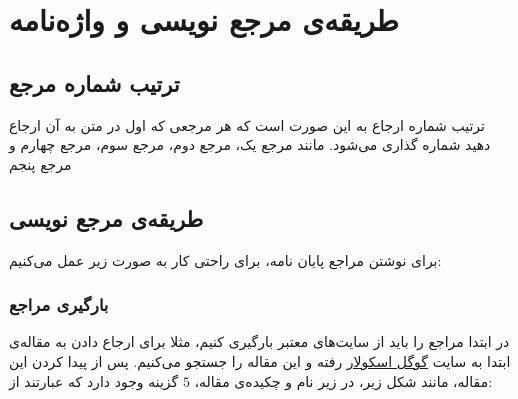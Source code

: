\chapter{طریقه‌ی مرجع نویسی و واژه‌نامه‌}
\section{ترتیب شماره مرجع}
ترتیب شماره ارجاع به این صورت است که هر مرجعی که اول در متن به آن ارجاع دهید شماره گذاری می‌شود. مانند مرجع یک\cite{ahmadi}،
مرجع دوم\cite{zakeri}، 
مرجع سوم\cite{bidabad2007classification}، 
مرجع چهارم\cite{aa}
و مرجع پنجم\cite{taghirad}
\section{طریقه‌ی مرجع نویسی}
برای نوشتن مراجع پایان نامه، برای راحتی کار به صورت زیر عمل می‌کنیم:

\subsection{بارگیری مراجع}
در ابتدا مراجع را باید از سایت‌های معتبر بارگیری کنیم، مثلا برای ارجاع دادن به مقاله‌ی
ابتدا به سایت
\href{scholar.google.com}{گوگل اسکولار} 
رفته و این مقاله را جستجو می‌کنیم. پس از پیدا کردن این مقاله، مانند شکل زیر، در زیر نام و چکیده‌ی مقاله، $5$ گزینه وجود دارد که عبارتند از:\\

